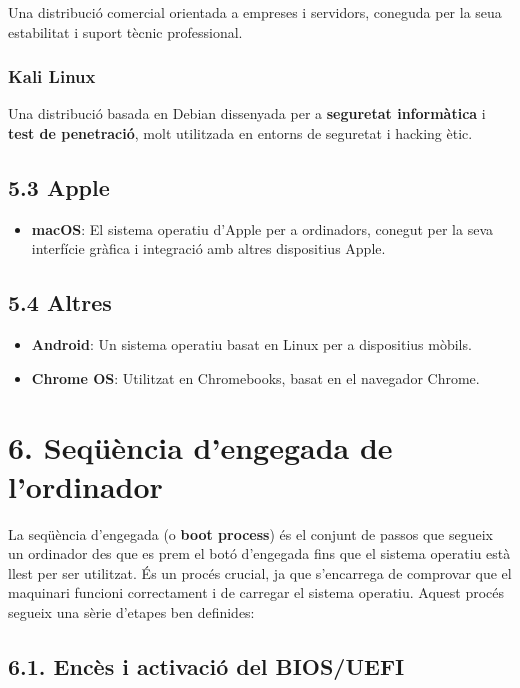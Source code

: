\documentclass[
  a4paper,
]{article}
\providecommand{\tightlist}{%
  \setlength{\itemsep}{0pt}\setlength{\parskip}{0pt}}
\begin{document}
Una distribució comercial orientada a empreses i servidors, coneguda per
la seua estabilitat i suport tècnic professional.

\subsubsection{Kali Linux}\label{kali-linux}

Una distribució basada en Debian dissenyada per a \textbf{seguretat
informàtica} i \textbf{test de penetració}, molt utilitzada en entorns
de seguretat i hacking ètic.

\subsection{5.3 Apple}\label{apple}

\begin{itemize}
\tightlist
\item
  \textbf{macOS}: El sistema operatiu d'Apple per a ordinadors, conegut
  per la seva interfície gràfica i integració amb altres dispositius
  Apple.
\end{itemize}

\subsection{5.4 Altres}\label{altres}

\begin{itemize}
\tightlist
\item
  \textbf{Android}: Un sistema operatiu basat en Linux per a dispositius
  mòbils.
\item
  \textbf{Chrome OS}: Utilitzat en Chromebooks, basat en el navegador
  Chrome.
\end{itemize}

\section{6. Seqüència d'engegada de
l'ordinador}\label{sequxfcuxe8ncia-dengegada-de-lordinador}

La seqüència d'engegada (o \textbf{boot process}) és el conjunt de
passos que segueix un ordinador des que es prem el botó d'engegada fins
que el sistema operatiu està llest per ser utilitzat. És un procés
crucial, ja que s'encarrega de comprovar que el maquinari funcioni
correctament i de carregar el sistema operatiu. Aquest procés segueix
una sèrie d'etapes ben definides:

\subsection{6.1. Encès i activació del
BIOS/UEFI}\label{encuxe8s-i-activaciuxf3-del-biosuefi}
\end{document}

